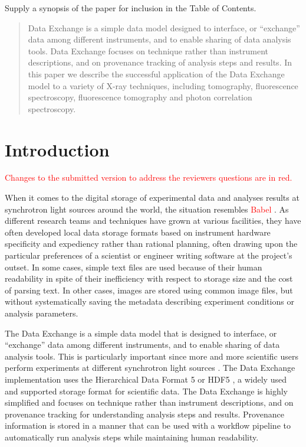 \documentclass[pdf]{iucr}              %
\begin{document}

\maketitle                        %

\begin{synopsis}
Supply a synopsis of the paper for inclusion in the Table of Contents.
\end{synopsis}

\begin{abstract}
Data Exchange is a simple data model designed to interface, or ``exchange'' data among different instruments, and to enable sharing of data analysis tools. Data Exchange focuses on technique rather than instrument descriptions, and on provenance tracking of analysis steps and results. In this paper we describe the successful application of the Data Exchange model to a variety of X-ray techniques, including tomography, fluorescence spectroscopy, fluorescence tomography and photon correlation spectroscopy.
\end{abstract}


\section{Introduction}


\textcolor{red}{Changes to the submitted version to address the reviewers questions are in red.}

When it comes to the digital storage of experimental data and analyses results at synchrotron light sources around the world, the situation resembles \textcolor{red}{Babel \cite{genesis}}. As different research teams and techniques have grown at various facilities, they have often developed local data storage formats based on instrument hardware specificity and expediency rather than rational planning, often drawing upon the particular preferences of a scientist or engineer writing software at the project's outset. In some cases, simple text files are used because of their human readability in spite of their inefficiency with respect to storage size and the cost of parsing text. In other cases, images are stored using common image files, but without systematically saving the metadata describing experiment conditions or analysis parameters.

The Data Exchange is a simple data model that is designed to interface, or ``exchange'' data among different instruments, and to enable sharing of data analysis tools. This is particularly important since more and more scientific users perform experiments at different synchrotron light sources \cite{Kanitpanyacharoen}. The Data Exchange implementation uses the Hierarchical Data Format 5 or HDF5 \cite{HDF5}, a widely used and supported storage format for scientific data. The Data Exchange is highly simplified and focuses on technique rather than instrument descriptions, and on provenance tracking for understanding analysis steps and results. Provenance information is stored in a manner that can be used with a workflow pipeline to automatically run analysis steps while maintaining human readability.
\end{document}
